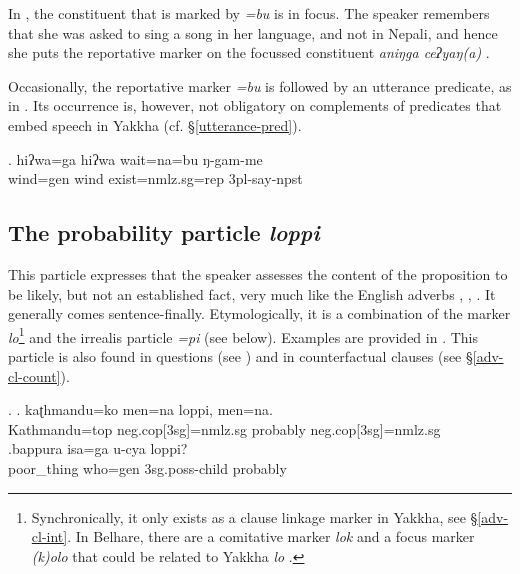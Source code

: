 In \Last[a], the constituent that is marked by \emph{=bu} is in focus. The speaker remembers that she was asked to sing a song in her language, and not in Nepali, and hence she puts the reportative marker on the focussed constituent \emph{aniŋga ceʔyaŋ(a)} .


Occasionally, the reportative marker \emph{=bu} is followed by an utterance predicate, as in \Next. Its occurrence is, however, not obligatory on complements of predicates that embed speech in Yakkha (cf. §\ref{utterance-pred}).
 
 \exg. hiʔwa=ga hiʔwa wait=na=bu  ŋ-gam-me\\
 wind{\sc =gen} wind exist{\sc [npst;3sg]=nmlz.sg=rep} {\sc 3pl-}say{\sc -npst}\\
 


\subsection{The probability particle \emph{loppi}}

This particle expresses that the speaker assesses the content of the proposition to be likely, but not an established fact, very much like the English adverbs , , . It generally comes sentence-finally. Etymologically, it is a combination of the marker \emph{lo}\footnote{Synchronically, it only exists  as a clause linkage marker in Yakkha, see §\ref{adv-cl-int}. In Belhare, there are a comitative marker \emph{lok} and a focus marker \emph{(k)olo} that could be related to Yakkha \emph{lo} \citep{Bickel2003Belhare}.} and the irrealis particle \emph{=pi} (see below). Examples are provided in \Next. This particle is also found in questions (see \Next[b]) and in counterfactual clauses (see §\ref{adv-cl-count}). 

\ex. \ag. kaʈhmandu=ko     men=na            loppi,  men=na.\\
Kathmandu{\sc =top} {\sc neg.cop[3sg]=nmlz.sg} probably  {\sc neg.cop[3sg]=nmlz.sg} \\
 
\bg.bappura  isa=ga    u-cya            loppi?\\
poor\_thing who{\sc =gen} {\sc 3sg.poss-}child probably\\
 


